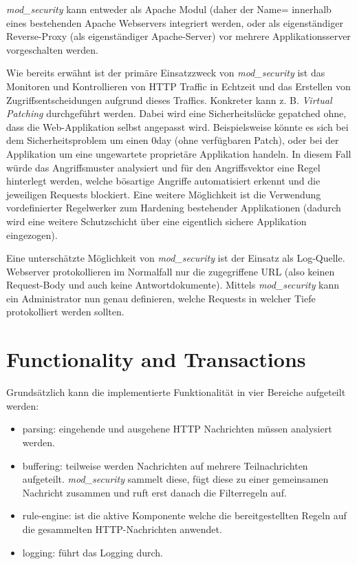 \textit{mod\_security} kann entweder als Apache Modul (daher der Name= innerhalb eines bestehenden Apache Webservers integriert werden, oder als eigenständiger Reverse-Proxy (als eigenständiger Apache-Server) vor mehrere Applikationsserver vorgeschalten werden.

Wie bereits erwähnt ist der primäre Einsatzzweck von \textit{mod\_security} ist das Monitoren und Kontrollieren von HTTP Traffic in Echtzeit und das Erstellen von Zugriffsentscheidungen aufgrund dieses Traffics. Konkreter kann z. B. \textit{Virtual Patching} durchgeführt werden. Dabei wird eine Sicherheitslücke gepatched ohne, dass die Web-Applikation selbst angepasst wird. Beispielsweise könnte es sich bei dem Sicherheitsproblem um einen 0day (ohne verfügbaren Patch), oder bei der Applikation um eine ungewartete proprietäre Applikation handeln. In diesem Fall würde das Angriffsmuster analysiert und für den Angriffsvektor eine Regel hinterlegt werden, welche bösartige Angriffe automatisiert erkennt und die jeweiligen Requests blockiert. Eine weitere Möglichkeit ist die Verwendung vordefinierter Regelwerker zum Hardening bestehender Applikationen (dadurch wird eine weitere Schutzschicht über eine eigentlich sichere Applikation eingezogen).

Eine unterschätzte Möglichkeit von \textit{mod\_security} ist der Einsatz als Log-Quelle. Webserver protokollieren im Normalfall nur die zugegriffene URL (also keinen Request-Body und auch keine Antwortdokumente). Mittels \textit{mod\_security} kann ein Administrator nun genau definieren, welche Requests in welcher Tiefe protokolliert werden sollten.

\section{Functionality and Transactions}

Grundsätzlich kann die implementierte Funktionalität in vier Bereiche aufgeteilt werden:

\begin{itemize}
	\item parsing: eingehende und ausgehene HTTP Nachrichten müssen analysiert werden.
	\item buffering: teilweise werden Nachrichten auf mehrere Teilnachrichten aufgeteilt. \textit{mod\_security} sammelt diese, fügt diese zu einer gemeinsamen Nachricht zusammen und ruft erst danach die Filterregeln auf.
	\item rule-engine: ist die aktive Komponente welche die bereitgestellten Regeln auf die gesammelten HTTP-Nachrichten anwendet.
	\item logging: führt das Logging durch.
\end{itemize}

